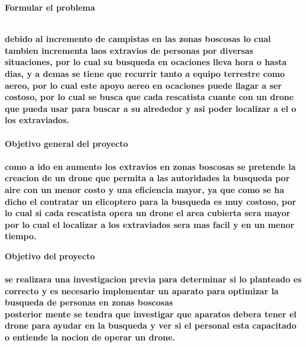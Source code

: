 \documentclass[12pt]{report}
\begin{document}
{\huge \textbf{Formular el problema}\\}\\
{\large \textbf{{debido al incremento de campistas en las zonas boscosas lo cual tambien incrementa laos extravios de personas por diversas situaciones, por lo cual su busqueda en ocaciones lleva hora o hasta dias, y a demas se tiene que recurrir tanto a equipo terrestre como aereo, por lo cual este apoyo aereo en ocaciones puede llagar a ser costoso, por lo cual se busca que cada rescatista cuante con un drone que pueda usar para buscar a su alrededor y asi poder localizar a el o los extraviados.  }}
\\\\


{\huge \textbf{Objetivo general del proyecto }\\}\\

{\large\textbf{ como a ido en aumento los extravios en zonas boscosas se pretende la creacion de un drone que permita a las autoridades la busqueda por aire con un menor costo y una eficiencia mayor, ya que como se ha dicho el contratar un elicoptero para la busqueda es muy costoso, por lo cual si cada rescatista opera un drone el area cubierta sera mayor por lo cual el localizar a los extraviados sera mas facil y en un menor tiempo.  }\\}

{\huge \textbf{Objetivo del proyecto  }\\}\\

{\large \textbf{ se realizara una investigacion previa para determinar si lo planteado es correcto y es necesario implementar un aparato para optimizar la busqueda de personas en zonas boscosas\\posterior mente se tendra que investigar que aparatos debera tener el drone para ayudar en la busqueda y ver si el personal esta capacitado o entiende la nocion de operar un drone.}\\}


}
\end{document}
